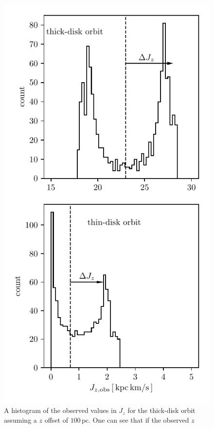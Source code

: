 \documentclass[twocolumn]{aastex62}
\newcommand{\pc}{\text{pc}}
\begin{document}
\begin{figure}
\begin{center}
\includegraphics[width=\columnwidth]{fig/schmactions_Jz_hist.pdf}
\end{center}
\caption{A histogram of the observed values in $J_z$ for the thick-disk orbit
assuming a $z$ offset of $100\,\pc$. One can see that if the observed $z$
}
\end{figure}
\end{document}
